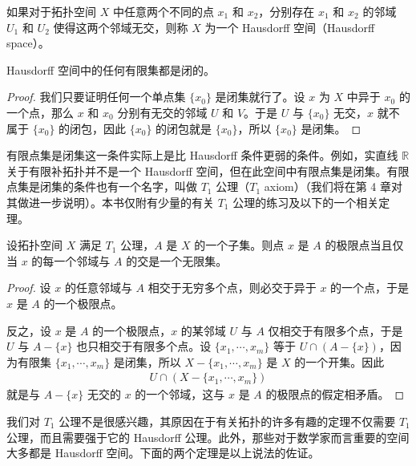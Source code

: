 \documentclass[../../main.tex]{subfiles}
\begin{document}
\begin{definition}[Hausdorff 空间]\label{definition:ch02-Hausdorff}
如果对于拓扑空间 $X$ 中任意两个不同的点 $x_{1}$ 和 $x_{2}$，分别存在 $x_{1}$ 和 $x_{2}$ 的邻域 $U_{1}$ 和 $U_{2}$ 使得这两个邻域无交，则称 $X$ 为一个 Hausdorff 空间（Hausdorff space）。
\end{definition}

\begin{theorem}\label{theorem:ch02-Hausdorff有限闭}
Hausdorff 空间中的任何有限集都是闭的。
\end{theorem}

\begin{proof}
我们只要证明任何一个单点集 $\{x_{0}\}$ 是闭集就行了。设 $x$ 为 $X$ 中异于 $x_{0}$ 的一个点，那么 $x$ 和 $x_{0}$ 分别有无交的邻域 $U$ 和 $V$。于是 $U$ 与 $\{x_{0}\}$ 无交，$x$ 就不属于 $\{x_{0}\}$ 的闭包，因此 $\{x_{0}\}$ 的闭包就是 $\{x_{0}\}$，所以 $\{x_{0}\}$ 是闭集。
\end{proof}

有限点集是闭集这一条件实际上是比 Hausdorff 条件更弱的条件。例如，实直线 $\mathbb{R}$ 关于有限补拓扑并不是一个 Hausdorff 空间，但在此空间中有限点集是闭集。有限点集是闭集的条件也有一个名字，叫做 $T_{1}$ 公理（$T_{1}$ axiom）（我们将在第 4 章对其做进一步说明）。本书仅附有少量的有关 $T_{1}$ 公理的练习及以下的一个相关定理。

\begin{theorem}[极限点的邻域判别（$T_{1}$ 公理）]\label{theorem:ch02-T1极限点}
设拓扑空间 $X$ 满足 $T_{1}$ 公理，$A$ 是 $X$ 的一个子集。则点 $x$ 是 $A$ 的极限点当且仅当 $x$ 的每一个邻域与 $A$ 的交是一个无限集。
\end{theorem}

\begin{proof}
设 $x$ 的任意邻域与 $A$ 相交于无穷多个点，则必交于异于 $x$ 的一个点，于是 $x$ 是 $A$ 的一个极限点。

反之，设 $x$ 是 $A$ 的一个极限点，$x$ 的某邻域 $U$ 与 $A$ 仅相交于有限多个点，于是 $U$ 与 $A - \{x\}$ 也只相交于有限多个点。设 $\{x_{1}, \cdots, x_{m}\}$ 等于 $U \cap (A - \{x\})$，因为有限集 $\{x_{1}, \cdots, x_{m}\}$ 是闭集，所以 $X - \{x_{1}, \cdots, x_{m}\}$ 是 $X$ 的一个开集。因此
\begin{align*}
U \cap (X - \{x_{1}, \cdots, x_{m}\})
\end{align*}
就是与 $A - \{x\}$ 无交的 $x$ 的一个邻域，这与 $x$ 是 $A$ 的极限点的假定相矛盾。
\end{proof}

我们对 $T_{1}$ 公理不是很感兴趣，其原因在于有关拓扑的许多有趣的定理不仅需要 $T_{1}$ 公理，而且需要强于它的 Hausdorff 公理。此外，那些对于数学家而言重要的空间大多都是 Hausdorff 空间。下面的两个定理是以上说法的佐证。
\end{document}
